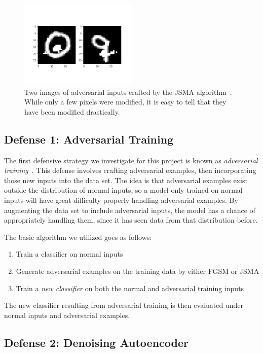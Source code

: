 \documentclass{article}
\begin{document}
\begin{figure}
  \includegraphics[width=0.5\textwidth]{jsma}
  \caption{Two images of adversarial inputs crafted by the JSMA
    algorithm~\cite{papernot2016limitations}. While only a few pixels were
  modified, it is easy to tell that they have been modified drastically.}%
  \label{fig:jsma-ax}
\end{figure}

\subsection{Defense 1: Adversarial Training}

The first defensive strategy we investigate for this project is known as
\textit{adversarial training}~\cite{goodfellow2014explaining}. This defense
involves crafting adversarial examples, then incorporating those new inputs into
the data set. The idea is that adversarial examples exist outside the
distribution of normal inputs, so a model only trained on normal inputs will
have great difficulty properly handling adversarial examples. By augmenting the
data set to include adversarial inputs, the model has a chance of appropriately
handling them, since it has seen data from that distribution before.

The basic algorithm we utilized goes as follows:
\begin{enumerate}
  \item Train a classifier on normal inputs
  \item Generate adversarial examples on the training data by either FGSM or JSMA
  \item Train a \textit{new classifier} on both the normal and adversarial
    training inputs
\end{enumerate}
The new classifier resulting from adversarial training is then evaluated under
normal inputs and adversarial examples.

\subsection{Defense 2: Denoising Autoencoder}
\end{document}
